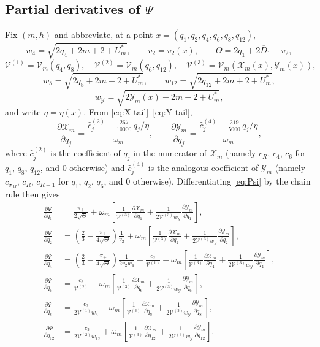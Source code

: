 \documentclass[11pt]{article}
\theoremstyle{definition}
\theoremstyle{remark}
\numberwithin{equation}{section}
\newcommand{\cV}{\mathcal V}
\newcommand{\cX}{\mathcal X}
\newcommand{\cY}{\mathcal Y}
\newcommand{\Db}{\overline D}
\begin{document}
\subsection*{Partial derivatives of \texorpdfstring{$\Psi$}{Psi}}

Fix $(m,h)$ and abbreviate, at a point $x=(q_1,q_2,q_4,q_6,q_8,q_{12})$,
\[
  w_4=\sqrt{2q_4+2m+2+U_m^*},
  \qquad
  v_2=v_2(x),
  \qquad
  \Theta=2q_1+2\Db_1-v_2,
\]
\[
  \cV^{(1)}=\cV_m(q_4,q_8),\quad
  \cV^{(2)}=\cV_m(q_6,q_{12}),\quad
  \cV^{(3)}=\cV_m(\cX_m(x),\cY_m(x)),
\]
\[
  w_8=\sqrt{2q_8+2m+2+U_m^*},\qquad
  w_{12}=\sqrt{2q_{12}+2m+2+U_m^*},
\]
\[
  w_{\cY}=\sqrt{2\cY_m(x)+2m+2+U_m^*},
\]
and write $\eta=\eta(x)$. From \eqref{eq:X-tail}--\eqref{eq:Y-tail},
\[
  \frac{\partial \cX_m}{\partial q_j}
  =\frac{\hat c_j^{(2)}-\frac{267}{10000}\,q_j/\eta}{\omega_m},
  \qquad
  \frac{\partial \cY_m}{\partial q_j}
  =\frac{\hat c_j^{(4)}-\frac{219}{5000}\,q_j/\eta}{\omega_m},
\]
where $\hat c_j^{(2)}$ is the coefficient of $q_j$ in the numerator of $\cX_m$ (namely
$c_R$, $c_4$, $c_6$ for $q_1$, $q_8$, $q_{12}$, and $0$ otherwise) and
$\hat c_j^{(4)}$ is the analogous coefficient of $\cY_m$ (namely $c_{\sigma_M}$, $c_R$,
$c_{R-1}$ for $q_1$, $q_2$, $q_6$, and $0$ otherwise). Differentiating \eqref{eq:Psi} by the
chain rule then gives
\begin{align*}
  \frac{\partial\Psi}{\partial q_1}
  &=\frac{\pi_+}{2\sqrt\Theta}
    +\omega_m\left[
      \frac1{\cV^{(3)}}\frac{\partial \cX_m}{\partial q_1}
      +\frac1{2\cV^{(3)}w_{\cY}}\frac{\partial \cY_m}{\partial q_1}
    \right],\\
  \frac{\partial\Psi}{\partial q_2}
  &=\left(\frac23-\frac{\pi_+}{4\sqrt\Theta}\right)\frac1{v_2}
    +\omega_m\left[
      \frac1{\cV^{(3)}}\frac{\partial \cX_m}{\partial q_2}
      +\frac1{2\cV^{(3)}w_{\cY}}\frac{\partial \cY_m}{\partial q_2}
    \right],\\
  \frac{\partial\Psi}{\partial q_4}
  &=\left(\frac23-\frac{\pi_+}{4\sqrt\Theta}\right)\frac1{2v_2w_4}
    +\frac{c_2}{\cV^{(1)}}
    +\omega_m\left[
      \frac1{\cV^{(3)}}\frac{\partial \cX_m}{\partial q_4}
      +\frac1{2\cV^{(3)}w_{\cY}}\frac{\partial \cY_m}{\partial q_4}
    \right],\\
  \frac{\partial\Psi}{\partial q_6}
  &=\frac{c_3}{\cV^{(2)}}
    +\omega_m\left[
      \frac1{\cV^{(3)}}\frac{\partial \cX_m}{\partial q_6}
      +\frac1{2\cV^{(3)}w_{\cY}}\frac{\partial \cY_m}{\partial q_6}
    \right],\\
  \frac{\partial\Psi}{\partial q_8}
  &=\frac{c_2}{2\cV^{(1)}w_8}
    +\omega_m\left[
      \frac1{\cV^{(3)}}\frac{\partial \cX_m}{\partial q_8}
      +\frac1{2\cV^{(3)}w_{\cY}}\frac{\partial \cY_m}{\partial q_8}
    \right],\\
  \frac{\partial\Psi}{\partial q_{12}}
  &=\frac{c_3}{2\cV^{(2)}w_{12}}
    +\omega_m\left[
      \frac1{\cV^{(3)}}\frac{\partial \cX_m}{\partial q_{12}}
      +\frac1{2\cV^{(3)}w_{\cY}}\frac{\partial \cY_m}{\partial q_{12}}
    \right].
\end{align*}
\end{document}
